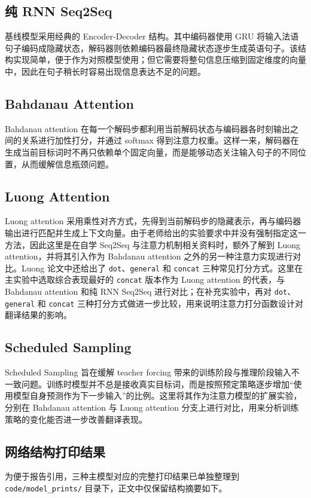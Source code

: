 \documentclass[a4paper]{article}
\begin{document}
\subsection{纯 RNN Seq2Seq}
基线模型采用经典的 Encoder-Decoder 结构\cite{sutskever2014sequence}。其中编码器使用 GRU 将输入法语句子编码成隐藏状态，解码器则依赖编码器最终隐藏状态逐步生成英语句子。该结构实现简单，便于作为对照模型使用；但它需要将整句信息压缩到固定维度的向量中，因此在句子稍长时容易出现信息表达不足的问题。

\subsection{Bahdanau Attention}
Bahdanau attention\cite{bahdanau2014neural} 在每一个解码步都利用当前解码状态与编码器各时刻输出之间的关系进行加性打分，并通过 softmax 得到注意力权重。这样一来，解码器在生成当前目标词时不再只依赖单个固定向量，而是能够动态关注输入句子的不同位置，从而缓解信息瓶颈问题。

\subsection{Luong Attention}
Luong attention\cite{luong2015effective} 采用乘性对齐方式，先得到当前解码步的隐藏表示，再与编码器输出进行匹配并生成上下文向量。由于老师给出的实验要求中并没有强制指定这一方法，因此这里是在自学 Seq2Seq 与注意力机制相关资料时，额外了解到 Luong attention，并将其引入作为 Bahdanau attention 之外的另一种注意力实现进行对比。Luong 论文中还给出了 \texttt{dot}、\texttt{general} 和 \texttt{concat} 三种常见打分方式。这里在主实验中选取综合表现最好的 \texttt{concat} 版本作为 Luong attention 的代表，与 Bahdanau attention 和纯 RNN Seq2Seq 进行对比；在补充实验中，再对 \texttt{dot}、\texttt{general} 和 \texttt{concat} 三种打分方式做进一步比较，用来说明注意力打分函数设计对翻译结果的影响。

\subsection{Scheduled Sampling}
Scheduled Sampling\cite{bengio2015scheduled} 旨在缓解 teacher forcing 带来的训练阶段与推理阶段输入不一致问题。训练时模型并不总是接收真实目标词，而是按照预定策略逐步增加“使用模型自身预测作为下一步输入”的比例。这里将其作为注意力模型的扩展实验，分别在 Bahdanau attention 与 Luong attention 分支上进行对比，用来分析训练策略的变化能否进一步改善翻译表现。

\subsection{网络结构打印结果}
为便于报告引用，三种主模型对应的完整打印结果已单独整理到 \texttt{code/model\_prints/} 目录下，正文中仅保留结构摘要如下。
\end{document}
